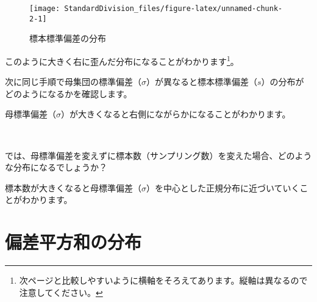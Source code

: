 \documentclass[]{tufte-handout}
\begin{document}
\begin{figure}

{\centering \texttt{[image: StandardDivision\_files/figure-latex/unnamed-chunk-2-1]} 

}

\caption[標本標準偏差の分布]{標本標準偏差の分布}\label{fig:unnamed-chunk-2}
\end{figure}

このように大きく右に歪んだ分布になることがわかります\footnote{次ページと比較しやすいように横軸をそろえてあります。縦軸は異なるので注意してください。}。

\newpage

次に同じ手順で母集団の標準偏差（\(\sigma\)）が異なると標本標準偏差（\(s\)）の分布がどのようになるかを確認します。

\begin{figure*}

{\centering {}

}

\end{figure*}

母標準偏差（\(\sigma\)）が大きくなると右側にながらかになることがわかります。

　

では、母標準偏差を変えずに標本数（サンプリング数）を変えた場合、どのような分布になるでしょうか？

\begin{figure*}

{\centering {}

}

\end{figure*}

標本数が大きくなると母標準偏差（\(\sigma\)）を中心とした正規分布に近づいていくことがわかります。

\newpage

\hypertarget{ux504fux5deeux5e73ux65b9ux548cux306eux5206ux5e03}{%
\section{偏差平方和の分布}\label{ux504fux5deeux5e73ux65b9ux548cux306eux5206ux5e03}}
\end{document}
